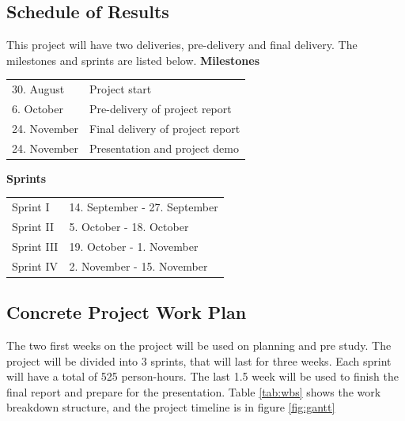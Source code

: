 \subsection{Schedule of Results}
This project will have two deliveries, pre-delivery and final delivery.  The milestones and sprints are listed below. \newline
\textbf{Milestones} \newline
\begin{tabular}{l  l}
	30. August & Project start \\
	6. October & Pre-delivery of project report \\
	24. November & Final delivery of project report \\
	24. November & Presentation and project demo \\
\end{tabular}
\newline
\textbf{Sprints} \newline
\begin{tabular}{l  l}
	Sprint I & 14. September - 27. September \\
	Sprint II & 5. October - 18. October \\
	Sprint III & 19. October - 1. November  \\
	Sprint IV & 2. November - 15. November \\
\end{tabular}

\subsection{Concrete Project Work Plan}
The two first weeks on the project will be used on planning and pre study.
The project will be divided into 3 sprints, that will last for three weeks. Each sprint will have a total of 525 person-hours.
The last 1.5 week will be used to finish the final report and prepare for the presentation. 
Table \ref{tab:wbs} shows the work breakdown structure, and the project timeline is in figure \ref{fig:gantt}

